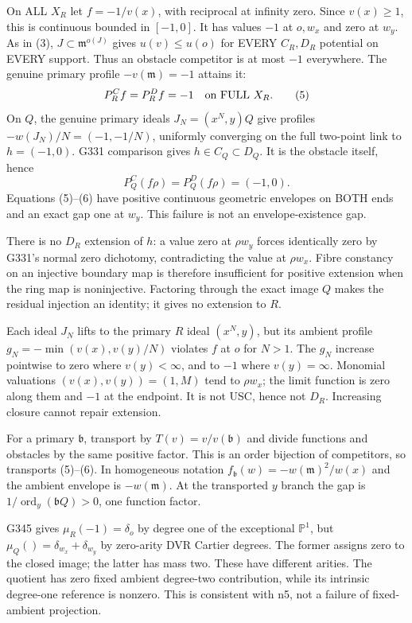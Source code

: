 \documentclass[11pt]{article}
\begin{document}
On ALL $X_R$ let $f=-1/v(x)$, with reciprocal at infinity zero. Since $v(x)\ge1$, this is continuous bounded in $[-1,0]$. It has values $-1$ at $o,w_x$ and zero at $w_y$. As in (3), $J\subset\mathfrak m^{o(J)}$ gives $u(v)\le u(o)$ for EVERY $C_R,D_R$ potential on EVERY support. Thus an obstacle competitor is at most $-1$ everywhere. The genuine primary profile $-v(\mathfrak m)=-1$ attains it:
\[
 P_R^Cf=P_R^Df=-1\quad\hbox{on FULL }X_R. \tag{5}
\]
On $Q$, the genuine primary ideals $J_N=(x^N,y)Q$ give profiles $-w(J_N)/N=(-1,-1/N)$, uniformly converging on the full two-point link to $h=(-1,0)$. G331 comparison gives $h\in C_Q\subset D_Q$. It is the obstacle itself, hence
\[
 P_Q^C(f\rho)=P_Q^D(f\rho)=(-1,0). \tag{6}
\]
Equations (5)--(6) have positive continuous geometric envelopes on BOTH ends and an exact gap one at $w_y$. This failure is not an envelope-existence gap.

There is no $D_R$ extension of $h$: a value zero at $\rho w_y$ forces identically zero by G331's normal zero dichotomy, contradicting the value at $\rho w_x$. Fibre constancy on an injective boundary map is therefore insufficient for positive extension when the ring map is noninjective. Factoring through the exact image $Q$ makes the residual injection an identity; it gives no extension to $R$.

Each ideal $J_N$ lifts to the primary $R$ ideal $(x^N,y)$, but its ambient profile $g_N=-\min(v(x),v(y)/N)$ violates $f$ at $o$ for $N>1$. The $g_N$ increase pointwise to zero where $v(y)<\infty$, and to $-1$ where $v(y)=\infty$. Monomial valuations $(v(x),v(y))=(1,M)$ tend to $\rho w_x$; the limit function is zero along them and $-1$ at the endpoint. It is not USC, hence not $D_R$. Increasing closure cannot repair extension.

For a primary $\mathfrak b$, transport by $T(v)=v/v(\mathfrak b)$ and divide functions and obstacles by the same positive factor. This is an order bijection of competitors, so transports (5)--(6). In homogeneous notation $f_{\mathfrak b}(w)=-w(\mathfrak m)^2/w(x)$ and the ambient envelope is $-w(\mathfrak m)$. At the transported $y$ branch the gap is $1/\operatorname{ord}_y(\mathfrak bQ)>0$, one function factor.

G345 gives $\mu_R(-1)=\delta_o$ by degree one of the exceptional $\mathbb P^1$, but $\mu_Q()=\delta_{w_x}+\delta_{w_y}$ by zero-arity DVR Cartier degrees. The former assigns zero to the closed image; the latter has mass two. These have different arities. The quotient has zero fixed ambient degree-two contribution, while its intrinsic degree-one reference is nonzero. This is consistent with n5, not a failure of fixed-ambient projection.
\end{document}
